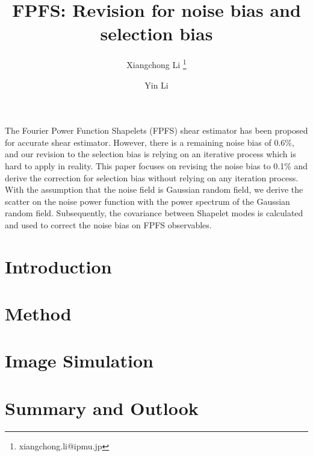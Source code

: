\documentclass{aa}
\begin{document}
\title{FPFS: Revision for noise bias and selection bias}
\author{Xiangchong Li   \thanks{xiangchong.li@ipmu.jp}
\and Yin Li }

\abstract
{}
{
The Fourier Power Function Shapelets (FPFS) shear estimator has been proposed for
accurate shear estimator. However, there is a remaining noise bias of 0.6\%,
and our revision to the selection bias is relying on an iterative process which
is hard to apply in reality.  This paper focuses on revising the noise bias
to 0.1\% and derive the correction for selection bias without relying on any
iteration process.
}
{
With the assumption that the noise field is Gaussian random field, we derive
the scatter on the noise power function with the power spectrum of the Gaussian
random field. Subsequently, the covariance between Shapelet modes is
calculated and used to correct the noise bias on FPFS observables.
}
{

}
{

}
\maketitle

\section{Introduction}
\label{sec:Intro}


\section{Method}
\label{sec:Method}


\section{Image Simulation}
\label{sec:sim}


\section{Summary and Outlook}
\label{sec:Summary}

\begin{acknowledgements}

\end{acknowledgements}



\end{document}
